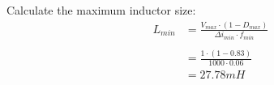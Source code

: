 Calculate the maximum inductor size:
\begin{align}
    L_{min} &= \frac{ V_{max} \cdot \left( 1 - D_{max} \right) } {\Delta i_{min} \cdot f_{min}}\\\nonumber
    \\ \nonumber
    &= \frac{1 \cdot (1 - 0.83)}{1000 \cdot 0.06}\\ \nonumber
    &= 27.78mH
\end{align}






